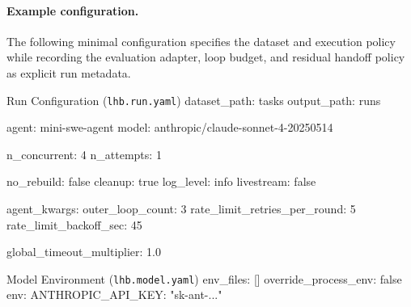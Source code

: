 \paragraph{Example configuration.}
The following minimal configuration specifies the dataset and execution policy while recording the evaluation adapter, loop budget, and residual handoff policy as explicit run metadata.

\begin{promptbox}{Run Configuration \textnormal{(\texttt{lhb.run.yaml})}}
dataset_path: tasks
output_path: runs

agent: mini-swe-agent
model: anthropic/claude-sonnet-4-20250514

n_concurrent: 4
n_attempts: 1

no_rebuild: false
cleanup: true
log_level: info
livestream: false

agent_kwargs:
  outer_loop_count: 3
  rate_limit_retries_per_round: 5
  rate_limit_backoff_sec: 45

global_timeout_multiplier: 1.0
\end{promptbox}

\begin{promptbox}{Model Environment \textnormal{(\texttt{lhb.model.yaml})}}
env_files: []
override_process_env: false
env:
  ANTHROPIC_API_KEY: "sk-ant-..."
\end{promptbox}

